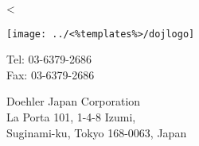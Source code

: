 \parbox[t]{.50\textwidth}{
\vspace{0.3cm}
<%
}
\parbox[t]{.48\textwidth}{

\parbox[t]{.30\textwidth}{
\vspace{0.0cm}
\texttt{[image: ../<\%templates\%>/dojlogo]} \\
}
\parbox[t]{.17\textwidth}{
\vspace{1.0cm}
     \small Tel: 03-6379-2686 \\
     \small Fax: 03-6379-2686
}

\parbox[t]{.47\textwidth}{
	 \Large Doehler Japan Corporation \\
	 \normalsize La Porta 101, 1-4-8 Izumi, \\
	 Suginami-ku, Tokyo 168-0063, Japan \\
}

}
